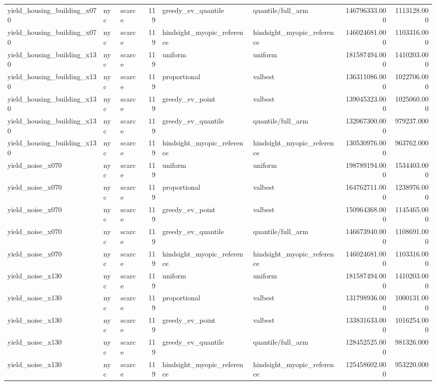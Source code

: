 \begin{tabular}{lllrllrr}
yield\_housing\_building\_x070 & nyc & scarce & 119 & greedy\_ev\_quantile & quantile/full\_arm & 146796333.000 & 1113128.000 \\
yield\_housing\_building\_x070 & nyc & scarce & 119 & hindsight\_myopic\_reference & hindsight\_myopic\_reference & 146024681.000 & 1103316.000 \\
yield\_housing\_building\_x130 & nyc & scarce & 119 & uniform & uniform & 181587494.000 & 1410203.000 \\
yield\_housing\_building\_x130 & nyc & scarce & 119 & proportional & valbest & 136311086.000 & 1022706.000 \\
yield\_housing\_building\_x130 & nyc & scarce & 119 & greedy\_ev\_point & valbest & 139045323.000 & 1025060.000 \\
yield\_housing\_building\_x130 & nyc & scarce & 119 & greedy\_ev\_quantile & quantile/full\_arm & 132067300.000 & 979237.000 \\
yield\_housing\_building\_x130 & nyc & scarce & 119 & hindsight\_myopic\_reference & hindsight\_myopic\_reference & 130530976.000 & 963762.000 \\
yield\_noise\_x070 & nyc & scarce & 119 & uniform & uniform & 198789194.000 & 1534403.000 \\
yield\_noise\_x070 & nyc & scarce & 119 & proportional & valbest & 164762711.000 & 1238976.000 \\
yield\_noise\_x070 & nyc & scarce & 119 & greedy\_ev\_point & valbest & 150964368.000 & 1145465.000 \\
yield\_noise\_x070 & nyc & scarce & 119 & greedy\_ev\_quantile & quantile/full\_arm & 146673940.000 & 1108691.000 \\
yield\_noise\_x070 & nyc & scarce & 119 & hindsight\_myopic\_reference & hindsight\_myopic\_reference & 146024681.000 & 1103316.000 \\
yield\_noise\_x130 & nyc & scarce & 119 & uniform & uniform & 181587494.000 & 1410203.000 \\
yield\_noise\_x130 & nyc & scarce & 119 & proportional & valbest & 131798936.000 & 1000131.000 \\
yield\_noise\_x130 & nyc & scarce & 119 & greedy\_ev\_point & valbest & 133831633.000 & 1016254.000 \\
yield\_noise\_x130 & nyc & scarce & 119 & greedy\_ev\_quantile & quantile/full\_arm & 128452525.000 & 981326.000 \\
yield\_noise\_x130 & nyc & scarce & 119 & hindsight\_myopic\_reference & hindsight\_myopic\_reference & 125458602.000 & 953220.000 \\

\end{tabular}
